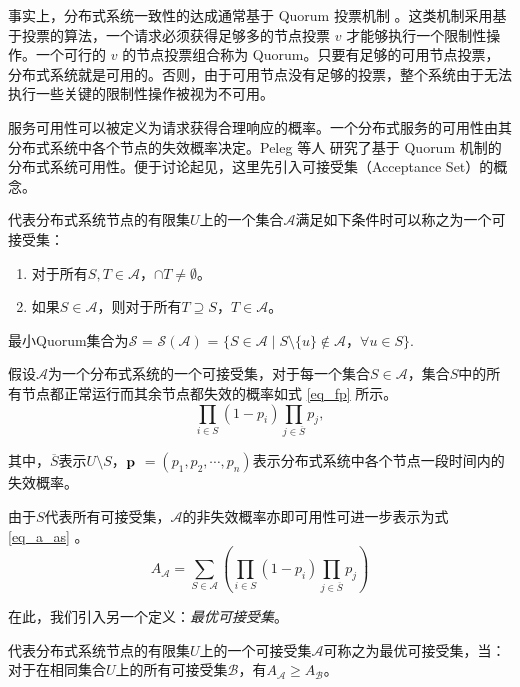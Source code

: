 事实上，分布式系统一致性的达成通常基于 Quorum 投票机制 \cite{Gifford:1979:WVR:800215.806583}。这类机制采用基于投票的算法，一个请求必须获得足够多的节点投票 $v$ 才能够执行一个限制性操作。一个可行的 $v$ 的节点投票组合称为 Quorum。只要有足够的可用节点投票，分布式系统就是可用的。否则，由于可用节点没有足够的投票，整个系统由于无法执行一些关键的限制性操作被视为不可用。

服务可用性可以被定义为请求获得合理响应的概率。一个分布式服务的可用性由其分布式系统中各个节点的失效概率决定。Peleg 等人 \cite{Peleg1995210} 研究了基于 Quorum 机制的分布式系统可用性。便于讨论起见，这里先引入可接受集（Acceptance Set）的概念\cite{Amir1998223}。

\begin{definition}
代表分布式系统节点的有限集$U$上的一个集合$\mathcal{A}$满足如下条件时可以称之为一个可接受集：
\begin{enumerate}[1)]
\item 对于所有$S, T \in \mathcal{A}$，$\cap T \neq \emptyset$。
\item 如果$S \in \mathcal{A}$，则对于所有$T \supseteq S$，$T \in \mathcal{A}$。
\end{enumerate}
最小Quorum集合为$\mathcal{S}$ = $\mathcal{S}(\mathcal{A})$ = $\{S \in \mathcal{A} \mid S \setminus \{u\} \notin \mathcal{A}$，$\forall u \in S\}$.
\end{definition}

假设$\mathcal{A}$为一个分布式系统的一个可接受集，对于每一个集合$S \in \mathcal{A}$，集合$S$中的所有节点都正常运行而其余节点都失效的概率如式 \eqref{eq_fp} 所示。
\begin{equation}\label{eq_fp}
\prod_{i \in S} (1-p_i) \prod_{j \in \overline S} p_j,
\end{equation}

其中，$\overline S$表示$U \setminus S$，$\bf p$ $= (p_1, p_2, \cdots, p_n)$表示分布式系统中各个节点一段时间内的失效概率。

由于$S$代表所有可接受集，$\mathcal{A}$的非失效概率亦即可用性可进一步表示为式 \eqref{eq_a_as} 。
\begin{equation}\label{eq_a_as}
A_{\mathcal{A}} = \sum_{S \in \mathcal{A}}(\prod_{i \in S} (1-p_i) \prod_{j \in \overline S} p_j)
\end{equation}

在此，我们引入另一个定义：\emph{最优可接受集}。
\begin{definition}
代表分布式系统节点的有限集$U$上的一个可接受集$\mathcal{A}$可称之为最优可接受集，当：对于在相同集合$U$上的所有可接受集$\mathcal{B}$，有$A_{\mathcal{A}} \geq A_{\mathcal{B}}$。
\end{definition}

